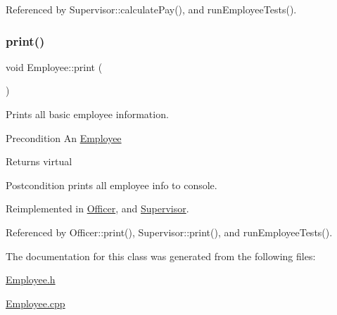 Referenced by Supervisor\+::calculate\+Pay(), and run\+Employee\+Tests().

\mbox{\label{classEmployee_a79556ad700627dba88049f487a34a762}} 
\subsubsection{\texorpdfstring{print()}{print()}}
{\footnotesize\ttfamily void Employee\+::print (\begin{DoxyParamCaption}{ }\end{DoxyParamCaption})\hspace{0.3cm}{\ttfamily [virtual]}}

Prints all basic employee information.

\begin{DoxyPrecond}{Precondition}
An \hyperlink{classEmployee}{Employee} 
\end{DoxyPrecond}
\begin{DoxyReturn}{Returns}
virtual 
\end{DoxyReturn}
\begin{DoxyPostcond}{Postcondition}
prints all employee info to console. 
\end{DoxyPostcond}


Reimplemented in \hyperlink{classOfficer_aeadece05a1a0b7fb29bd412830d2e07a}{Officer}, and \hyperlink{classSupervisor_a92483dc9a54904d79b46c6ec4efb3f54}{Supervisor}.



Referenced by Officer\+::print(), Supervisor\+::print(), and run\+Employee\+Tests().



The documentation for this class was generated from the following files\+:\begin{DoxyCompactItemize}
\item 
\hyperlink{Employee_8h}{Employee.\+h}\item 
\hyperlink{Employee_8cpp}{Employee.\+cpp}\end{DoxyCompactItemize}
